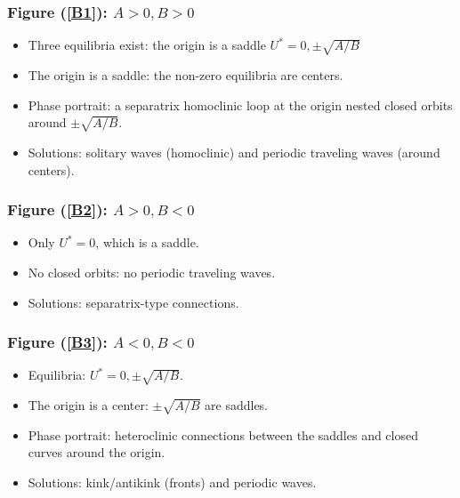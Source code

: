 \documentclass{article}
\numberwithin{equation}{section}
\begin{document}
\subsubsection*{Figure (\ref{B1}): $A>0, B>0$}
\begin{itemize}
    \item Three equilibria exist: the origin is a saddle $U^\ast = 0, \pm \sqrt{A/B}$
    \item The origin is a saddle: the non-zero equilibria are centers.
    \item Phase portrait: a separatrix homoclinic loop at the origin nested closed orbits around $\pm \sqrt{A/B}$.
    \item Solutions: solitary waves (homoclinic) and periodic traveling waves (around centers).
\end{itemize}

\subsubsection*{Figure (\ref{B2}): $A>0, B<0$}
\begin{itemize}
    \item Only $U^\ast = 0$, which is a saddle.
    \item No closed orbits: no periodic traveling waves.
    \item Solutions: separatrix-type connections.
\end{itemize}

\subsubsection*{Figure (\ref{B3}): $A<0, B<0$}
\begin{itemize}
    \item Equilibria: $U^\ast = 0, \pm \sqrt{A/B}$.
    \item The origin is a center: $\pm \sqrt{A/B}$ are saddles.
    \item Phase portrait: heteroclinic connections between the saddles and closed curves around the origin.
    \item Solutions: kink/antikink (fronts) and periodic waves.
\end{itemize}
\end{document}
